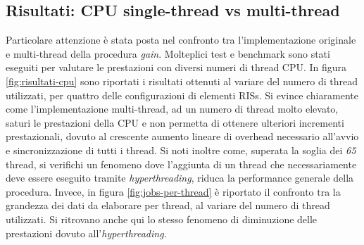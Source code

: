\subsection{Risultati: CPU single-thread vs multi-thread}
\label{subsec:risultati-cpu}

Particolare attenzione è stata posta nel confronto tra l'implementazione
originale e multi-thread della procedura \textit{gain}. Molteplici test e
benchmark sono stati eseguiti per valutare le prestazioni con diversi numeri di
thread CPU. In figura \ref{fig:risultati-cpu} sono riportati i risultati ottenuti
al variare del numero di thread utilizzati, per quattro delle configurazioni di
elementi RISs. Si evince chiaramente come l'implementazione multi-thread, ad un
numero di thread molto elevato, saturi le prestazioni della CPU e non permetta di
ottenere ulteriori incrementi prestazionali, dovuto al crescente aumento lineare
di overhead necessario all'avvio e sincronizzazione di tutti i thread. Si noti inoltre
come, superata la soglia dei \textit{65} thread, si verifichi un fenomeno dove l'aggiunta
di un thread che necessariamente deve essere eseguito tramite \textit{hyperthreading},
riduca la performance generale della procedura. Invece, in figura
\ref{fig:jobs-per-thread} è riportato il confronto tra la grandezza dei dati da
elaborare per thread, al variare del numero di thread utilizzati. Si ritrovano
anche qui lo stesso fenomeno di diminuzione delle prestazioni dovuto all'\textit{hyperthreading}.

